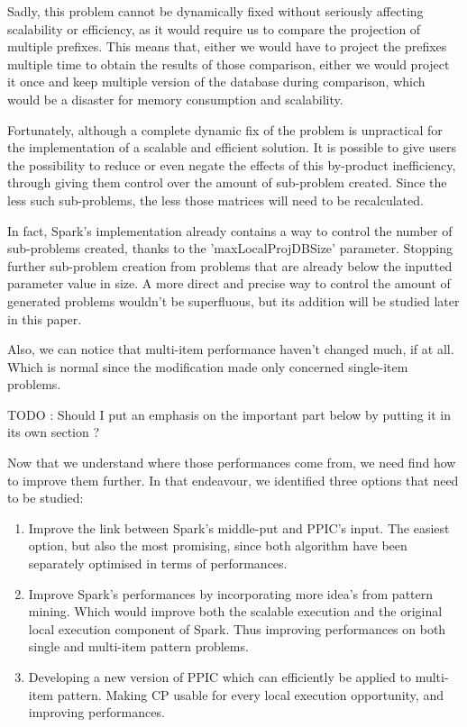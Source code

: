 \documentclass{eplmastersthesis}
\begin{document}
\begin{enumerate}
Sadly, this problem cannot be dynamically fixed without seriously affecting scalability or efficiency, as it would require us to compare the projection of multiple prefixes. This means that, either we would have to project the prefixes multiple time to obtain the results of those comparison, either we would project it once and keep multiple version of the database during comparison, which would be a disaster for memory consumption and scalability.\newline

Fortunately, although a complete dynamic fix of the problem is unpractical for the implementation of a scalable and efficient solution. It is possible to give users the possibility to reduce or even negate the effects of this by-product inefficiency, through giving them control over the amount of sub-problem created. Since the less such sub-problems, the less those matrices will need to be recalculated. \newline

In fact, Spark's implementation already contains a way to control the number of sub-problems created, thanks to the 'maxLocalProjDBSize' parameter. Stopping further sub-problem creation from problems that are already below the inputted parameter value in size. A more direct and precise way to control the amount of generated problems wouldn't be superfluous, but its addition will be studied later in this paper.

\end{enumerate}

Also, we can notice that multi-item performance haven't changed much, if at all. Which is normal since the modification made only concerned single-item problems. \newline

TODO : Should I put an emphasis on the important part below by putting it in its own section ? \newline

Now that we understand where those performances come from, we need find how to improve them further. In that endeavour, we identified three options that need to be studied:

\begin{enumerate}
	\item Improve the link between Spark's middle-put and PPIC's input. The easiest option, but also the most promising, since both algorithm have been separately optimised in terms of performances.
	\item Improve Spark's performances by incorporating more idea's from pattern mining.
Which would improve both the scalable execution and the original local execution component of Spark. Thus improving performances on both single and multi-item pattern problems.
	\item Developing a new version of PPIC which can efficiently be applied to multi-item pattern. Making CP usable for every local execution opportunity, and improving performances.
\end{enumerate}
\end{document}
